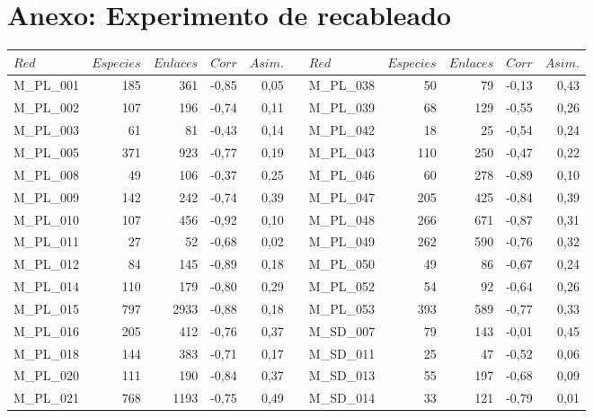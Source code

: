 \section{Anexo: Experimento de recableado}
\label{ESTATICA_ANEXO_tabrecableado}
\begin{table}[ht!]
\fontsize{2.5mm}{2.5mm}\selectfont
  \centering
      \begin{tabular}{lrrrrrlrrrr}
    \toprule
    $Red$  & $Especies$ & $Enlaces$ & $Corr$ & $Asim.$ &      & $Red$  & $Especies$ & $Enlaces$ & $Corr$& $Asim.$ \\
    \midrule
      M\_PL\_001 & 185  & 361  & -0,85 & 0,05 &      & M\_PL\_038 & 50   & 79   & -0,13 & 0,43 \\
    M\_PL\_002 & 107  & 196  & -0,74 & 0,11 &      & M\_PL\_039 & 68   & 129  & -0,55 & 0,26 \\
    M\_PL\_003 & 61   & 81   & -0,43 & 0,14 &      & M\_PL\_042 & 18   & 25   & -0,54 & 0,24 \\
    M\_PL\_005 & 371  & 923  & -0,77 & 0,19 &      & M\_PL\_043 & 110  & 250  & -0,47 & 0,22 \\
    M\_PL\_008 & 49   & 106  & -0,37 & 0,25 &      & M\_PL\_046 & 60   & 278  & -0,89 & 0,10 \\
    M\_PL\_009 & 142  & 242  & -0,74 & 0,39 &      & M\_PL\_047 & 205  & 425  & -0,84 & 0,39 \\
    M\_PL\_010 & 107  & 456  & -0,92 & 0,10 &      & M\_PL\_048 & 266  & 671  & -0,87 & 0,31 \\
    M\_PL\_011 & 27   & 52   & -0,68 & 0,02 &      & M\_PL\_049 & 262  & 590  & -0,76 & 0,32 \\
    M\_PL\_012 & 84   & 145  & -0,89 & 0,18 &      & M\_PL\_050 & 49   & 86   & -0,67 & 0,24 \\
    M\_PL\_014 & 110  & 179  & -0,80 & 0,29 &      & M\_PL\_052 & 54   & 92   & -0,64 & 0,26 \\
    M\_PL\_015 & 797  & 2933 & -0,88 & 0,18 &      & M\_PL\_053 & 393  & 589  & -0,77 & 0,33 \\
    M\_PL\_016 & 205  & 412  & -0,76 & 0,37 &      & M\_SD\_007 & 79   & 143  & -0,01 & 0,45 \\
    M\_PL\_018 & 144  & 383  & -0,71 & 0,17 &      & M\_SD\_011 & 25   & 47   & -0,52 & 0,06 \\
    M\_PL\_020 & 111  & 190  & -0,84 & 0,37 &      & M\_SD\_013 & 55   & 197  & -0,68 & 0,09 \\
    M\_PL\_021 & 768  & 1193 & -0,75 & 0,49 &      & M\_SD\_014 & 33   & 121  & -0,79 & 0,01 \\

\end{tabular}
\end{table}
